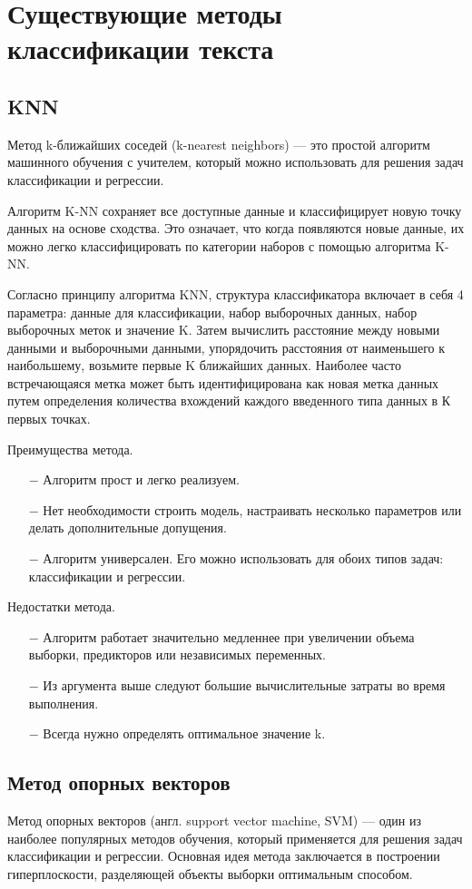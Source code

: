 \section{Существующие методы классификации текста}
\subsection{KNN}
Метод k-ближайших соседей (k-nearest neighbors) –-- это простой алгоритм машинного обучения с учителем, который можно использовать для решения задач классификации и регрессии.

Алгоритм K-NN сохраняет все доступные данные и классифицирует новую точку данных на основе сходства. Это означает, что когда появляются новые данные, их можно легко классифицировать по категории наборов с помощью алгоритма K-NN.

Согласно принципу алгоритма KNN, структура классификатора включает в себя 4 параметра: данные для классификации, набор выборочных данных, набор выборочных меток и значение K. Затем вычислить расстояние между новыми данными и выборочными данными, упорядочить расстояния от наименьшего к наибольшему, возьмите первые K ближайших данных. Наиболее часто встречающаяся метка может быть идентифицирована как новая метка данных путем определения количества вхождений каждого введенного типа данных в К первых точках.

Преимущества метода.
\begin{itemize}
	\item[$-$] Алгоритм прост и легко реализуем.
	\item[$-$] Нет необходимости строить модель, настраивать несколько параметров или делать дополнительные допущения.
	\item[$-$] Алгоритм универсален. Его можно использовать для обоих типов задач: классификации и регрессии.	
\end{itemize}
Недостатки метода.
\begin{itemize}
	\item[$-$] Алгоритм работает значительно медленнее при увеличении объема выборки, предикторов или независимых переменных.
	\item[$-$] Из аргумента выше следуют большие вычислительные затраты во время выполнения.
	\item[$-$] Всегда нужно определять оптимальное значение k.
\end{itemize}
\subsection{Метод опорных векторов}
Метод опорных векторов (англ. support vector machine, SVM) — один из наиболее популярных методов обучения, который применяется для решения задач классификации и регрессии. Основная идея метода заключается в построении гиперплоскости, разделяющей объекты выборки оптимальным способом.

